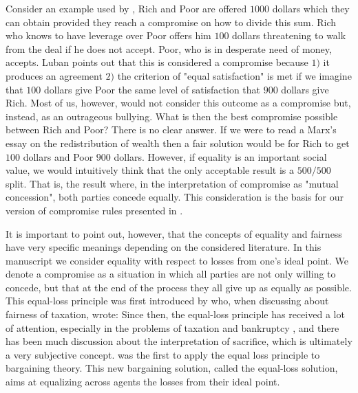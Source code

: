 Consider an example used by \cite{Luban1985}, Rich and Poor are offered $1000$ dollars which they can obtain provided they reach a compromise on how to divide this sum. 
Rich who knows to have leverage over Poor offers him $100$ dollars threatening to walk from the deal if he does not accept. Poor, who is in desperate need of money, accepts.
Luban points out that this is considered a compromise because $1)$ it produces an agreement $2)$ the criterion of "equal satisfaction" is met if we imagine that $100$ dollars give Poor the same level of satisfaction that $900$ dollars give Rich. Most of us, however, would not consider this outcome as a compromise but, instead, as an outrageous bullying. 
What is then the best compromise possible between Rich and Poor? There is no clear answer.
If we were to read a Marx's essay on the redistribution of wealth then a fair solution would be for Rich to get $100$ dollars and Poor $900$ dollars.
However, if equality is an important social value, we would intuitively think that the only acceptable result is a $500/500$ split. That is, the result where, in the interpretation of compromise as "mutual concession", both parties concede equally.
This consideration is the basis for our version of compromise rules presented in .

It is important to point out, however, that the concepts of equality and fairness have very specific meanings depending on the considered literature. 
In this manuscript we consider equality with respect to losses from one's ideal point. 
We denote a compromise as a situation in which all parties are not only willing to concede, but that at the end of the process they all give up as equally as possible. 
This equal-loss principle was first introduced by \citet[p. 396]{Mill1849} who, when discussing about fairness of taxation, wrote: \textit{} 
Since then, the equal-loss principle has received a lot of attention, especially in the problems of taxation \citep{Edgeworth1897,Young1987} and bankruptcy \citep{Herrero2001, Aumann1985}, and there has been much discussion about the interpretation of sacrifice, which is ultimately a very subjective concept. \citet{Chun1988} was the first to apply the equal loss principle to bargaining theory. This new bargaining solution, called the equal-loss solution, aims at equalizing across agents the losses from their ideal point.

